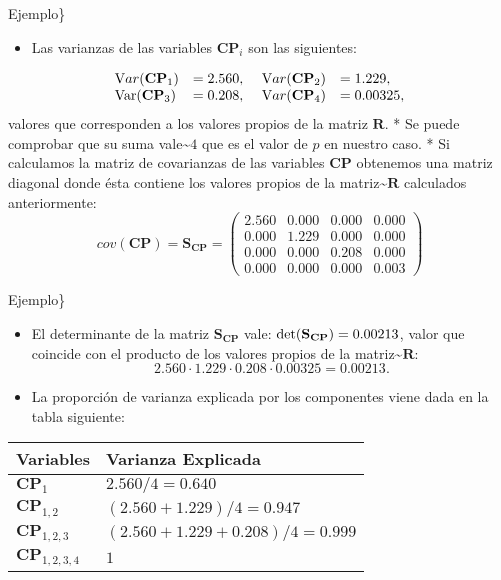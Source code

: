 \documentclass[
  spanish,
  ignorenonframetext,
]{beamer}
\providecommand{\tightlist}{%
  \setlength{\itemsep}{0pt}\setlength{\parskip}{0pt}}
\begin{document}
\begin{frame}{Ejemplo\}}
\protect\hypertarget{ejemplo-17}{}
\begin{itemize}
\tightlist
\item
  Las varianzas de las variables \(\mathbf{CP}_i\) son las siguientes:
\end{itemize}

\[
\begin{array}{llcll}
{\mathrm Var}(\mathbf{CP}_1) & =  2.560,\ & {\mathrm Var}(\mathbf{CP}_2) & =  1.229,\\  {\rm
Var}(\mathbf{CP}_3) & =  0.208,\   &{\mathrm Var}(\mathbf{CP}_4) & =  0.00325,
\end{array}
\] valores que corresponden a los valores propios de la matriz
\(\mathbf{R}\). * Se puede comprobar que su suma
vale\textasciitilde{}\(4\) que es el valor de \(p\) en nuestro caso. *
Si calculamos la matriz de covarianzas de las variables \(\mathbf{CP}\)
obtenemos una matriz diagonal donde ésta contiene los valores propios de
la matriz\textasciitilde{}\(\mathbf{R}\) calculados anteriormente: \[
cov(\mathbf{CP})= \mathbf{S}_{\mathbf{CP}} = 
\left(
\begin{array}{rrrr}
2.560 & 0.000 & 0.000 & 0.000 \\
 0.000 & 1.229 & 0.000 & 0.000 \\
 0.000 & 0.000 & 0.208 & 0.000 \\
 0.000 & 0.000 & 0.000 & 0.003 
\end{array}
\right)
\]
\end{frame}

\begin{frame}{Ejemplo\}}
\protect\hypertarget{ejemplo-18}{}
\begin{itemize}
\tightlist
\item
  El determinante de la matriz \(\mathbf{S}_{\mathbf{CP}}\) vale:
  \({\rm det}(\mathbf{S}_{\mathbf{CP}} )=0.00213\), valor que coincide
  con el producto de los valores propios de la
  matriz\textasciitilde{}\(\mathbf{R}\): \[
  2.560\cdot 1.229\cdot 0.208\cdot 0.00325 = 0.00213.
  \]
\item
  La proporción de varianza explicada por los componentes viene dada en
  la tabla siguiente:
\end{itemize}

\begin{tabular}{|l|l|}\hline
Variables&Varianza Explicada\\\hline
$\mathbf{CP}_1$&$2.560/4=0.640$\\\hline
$\mathbf{CP}_{1,2}$&$(2.560+1.229)/4=0.947$\\\hline
$\mathbf{CP}_{1,2,3}$&$(2.560+1.229+0.208)/4=0.999$\\\hline
$\mathbf{CP}_{1,2,3,4}$&$1$\\\hline
\end{tabular}
\end{frame}
\end{document}
